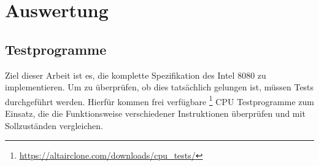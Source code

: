 \chapter{Auswertung}\label{chap:eval}

\section{Testprogramme}

Ziel dieser Arbeit ist es, die komplette Spezifikation des Intel 8080 zu implementieren. Um zu überprüfen, ob dies tatsächlich gelungen ist, müssen Tests durchgeführt werden. Hierfür kommen frei verfügbare \footnote[1]{\url{https://altairclone.com/downloads/cpu_tests/}} CPU Testprogramme zum Einsatz, die die Funktionsweise verschiedener Instruktionen überprüfen und mit Sollzuständen vergleichen.

